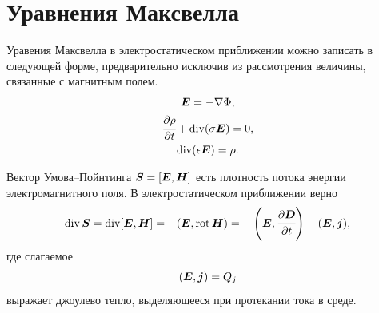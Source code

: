 
\section{Уравнения Максвелла}

Уравения Максвелла в электростатическом приближении можно записать в следующей форме, предварительно исключив из рассмотрения величины, связанные с магнитным полем.
\begin{subequations}
\begin{gather}
    {\boldsymbol{E}} = -\nabla \Phi,
    \label{eq:electrostatic_a} \\
    \cfrac{\partial \rho}{\partial t} + \operatorname{{div}} (\sigma {\boldsymbol{E}}) = 0,
    \label{eq:electrostatic_b} \\
    \operatorname{{div}} (\epsilon {\boldsymbol{E}}) = \rho.
    \label{eq:electrostatic_c}
\end{gather}
\label{eq:electrostatic}
\end{subequations}

Вектор Умова--Пойнтинга $\boldsymbol{S} = [{\boldsymbol{E}}, \boldsymbol{H}]$ есть плотность потока энергии электромагнитного поля. В электростатическом приближении верно
\begin{equation}
    \operatorname{{div}} \boldsymbol{S} = \operatorname{{div}} [{\boldsymbol{E}}, \boldsymbol{H}] = -({\boldsymbol{E}}, \operatorname{{rot}} \boldsymbol{H}) = -\left( {\boldsymbol{E}}, \cfrac{\partial {\boldsymbol{D}}}{\partial t} \right) - ({\boldsymbol{E}}, {\boldsymbol{j}}),
    \label{eq:poynting_vector}
\end{equation}
где слагаемое
\begin{equation}
    ({\boldsymbol{E}}, {\boldsymbol{j}}) = Q_j
    \label{eq:heat}
\end{equation}
выражает джоулево тепло, выделяющееся при протекании тока в среде.